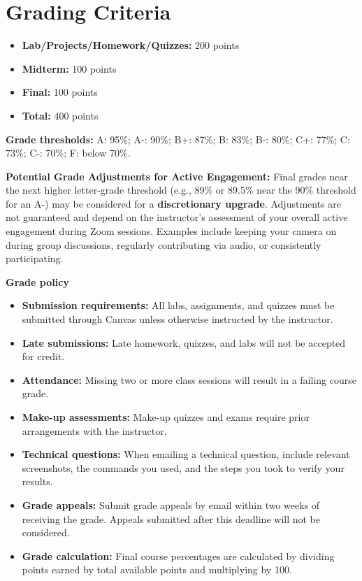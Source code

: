 \documentclass[10pt]{article}
\begin{document}
\section{Grading Criteria}
\begin{itemize}[label={},leftmargin=0pt,itemsep=0.1em]
  \item \textbf{Lab/Projects/Homework/Quizzes:} 200 points
  \item \textbf{Midterm:} 100 points
  \item \textbf{Final:} 100 points
  \item \textbf{Total:} 400 points
\end{itemize}

\textbf{Grade thresholds:} A: 95\%; A-: 90\%; B+: 87\%; B: 83\%; B-: 80\%; C+: 77\%; C: 73\%; C-: 70\%; F: below 70\%.

\textbf{Potential Grade Adjustments for Active Engagement:} Final grades near the next higher letter-grade threshold (e.g., 89\% or 89.5\% near the 90\% threshold for an A-) may be considered for a \textbf{discretionary upgrade}. Adjustments are not guaranteed and depend on the instructor's assessment of your overall active engagement during Zoom sessions. Examples include keeping your camera on during group discussions, regularly contributing via audio, or consistently participating.

\begin{policybox}
  \textbf{Grade policy}
  \begin{itemize}
    \item \textbf{Submission requirements:} All labs, assignments, and quizzes must be submitted through Canvas unless otherwise instructed by the instructor.
    \item \textbf{Late submissions:} Late homework, quizzes, and labs will not be accepted for credit.
    \item \textbf{Attendance:} Missing two or more class sessions will result in a failing course grade.
    \item \textbf{Make-up assessments:} Make-up quizzes and exams require prior arrangements with the instructor.
    \item \textbf{Technical questions:} When emailing a technical question, include relevant screenshots, the commands you used, and the steps you took to verify your results.
    \item \textbf{Grade appeals:} Submit grade appeals by email within two weeks of receiving the grade. Appeals submitted after this deadline will not be considered.
    \item \textbf{Grade calculation:} Final course percentages are calculated by dividing points earned by total available points and multiplying by 100.
  \end{itemize}
\end{policybox}
\end{document}
